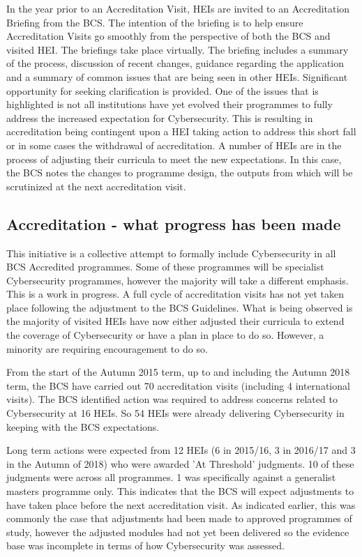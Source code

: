 \documentclass[sigconf,anonymous]{acmart}
\begin{document}
In the year prior to an Accreditation Visit, HEIs are invited to an Accreditation Briefing from the BCS. The intention of the briefing is to help ensure Accreditation Visits go smoothly from the perspective of both the BCS and visited HEI. The briefings take place virtually. The briefing includes a summary of the process, discussion of recent changes, guidance regarding the application and a summary of common issues that are being seen in other HEIs. Significant opportunity for seeking clarification is provided. One of the issues that is highlighted is not all institutions have yet evolved their programmes to fully address the increased expectation for Cybersecurity. This is resulting in accreditation being contingent upon a HEI taking action to address this short fall or in some cases the withdrawal of accreditation. A number of HEIs are in the process of adjusting their curricula to meet the new expectations. In this case, the BCS notes the changes to programme design, the outputs from which will be scrutinized at the next accreditation visit.

\subsection{Accreditation - what progress has been made}

This initiative is a collective attempt to formally include Cybersecurity in all BCS Accredited programmes. Some of these programmes will be specialist Cybersecurity programmes, however the majority will take a different emphasis. This is a work in progress. A full cycle of accreditation visits has not yet taken place following the adjustment to the BCS Guidelines. What is being observed is the majority of visited HEIs have now either adjusted their curricula to extend the coverage of Cybersecurity or have a plan in place to do so. However, a minority are requiring encouragement to do so.

From the start of the Autumn 2015 term, up to and including the Autumn 2018 term, the BCS have carried out 70 accreditation visits (including 4 international visits). The BCS identified action was required to address concerns related to Cybersecurity at 16 HEIs. So 54 HEIs were already delivering Cybersecurity in keeping with the BCS expectations.

Long term actions were expected from 12 HEIs (6 in 2015/16, 3 in 2016/17 and 3 in the Autumn of 2018) who were awarded 'At Threshold' judgments. 10 of these judgments were across all programmes. 1 was specifically against a generalist masters programme only. This indicates that the BCS will expect adjustments to have taken place before the next accreditation visit. As indicated earlier, this was commonly the case that adjustments had been made to approved programmes of study, however the adjusted modules had not yet been delivered so the evidence base was incomplete in terms of how Cybersecurity was assessed.
 
\end{document}
